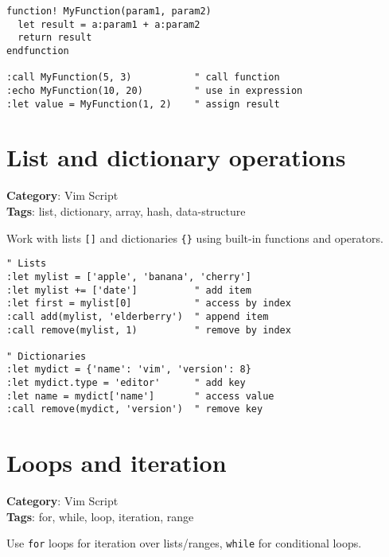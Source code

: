{{{{{{{{{{{{{{{{{{\begin{Exa*}{}
\begin{Verbatim}[fontsize=\footnotesize, breaklines, breakanywhere]
function! MyFunction(param1, param2)
  let result = a:param1 + a:param2
  return result
endfunction

:call MyFunction(5, 3)           " call function
:echo MyFunction(10, 20)         " use in expression
:let value = MyFunction(1, 2)    " assign result
\end{Verbatim}
\end{Exa*}

\section{List and dictionary operations}

\textbf{Category}: Vim Script\\ \textbf{Tags}: list, dictionary, array, hash, data-structure
\vspace{0.5cm}

Work with lists {\footnotesize \Verb§[]§} and dictionaries {\footnotesize \Verb§{}§} using built-in functions and operators.

\begin{Exa*}{}
\begin{Verbatim}[fontsize=\footnotesize, breaklines, breakanywhere]
" Lists
:let mylist = ['apple', 'banana', 'cherry']
:let mylist += ['date']          " add item
:let first = mylist[0]           " access by index
:call add(mylist, 'elderberry')  " append item
:call remove(mylist, 1)          " remove by index

" Dictionaries
:let mydict = {'name': 'vim', 'version': 8}
:let mydict.type = 'editor'      " add key
:let name = mydict['name']       " access value
:call remove(mydict, 'version')  " remove key
\end{Verbatim}
\end{Exa*}

\section{Loops and iteration}

\textbf{Category}: Vim Script\\ \textbf{Tags}: for, while, loop, iteration, range
\vspace{0.5cm}

Use {\footnotesize \Verb§for§} loops for iteration over lists/ranges, {\footnotesize \Verb§while§} for conditional loops.

}}}}}}}}}}}}}}}}}}
